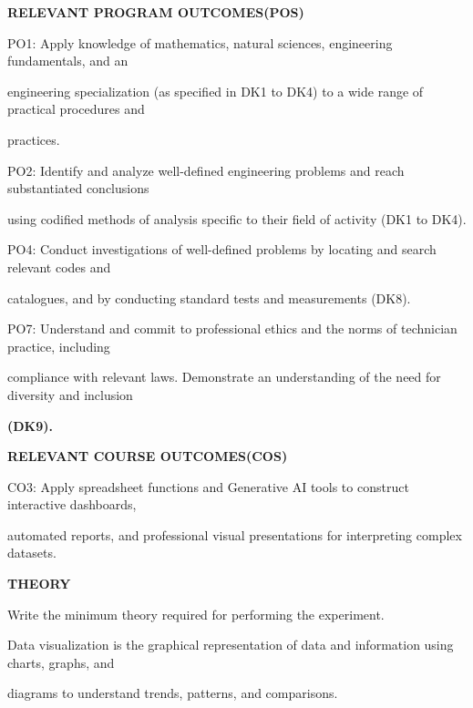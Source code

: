 \documentclass[10pt,a4paper]{article}
\begin{document}
\medskip\noindent\textbf{RELEVANT PROGRAM OUTCOMES(POS)}\par
\noindent PO1: Apply knowledge of mathematics, natural sciences, engineering fundamentals, and an\par
\noindent engineering specialization (as specified in DK1 to DK4) to a wide range of practical procedures and\par
\noindent practices.\par
\noindent PO2: Identify and analyze well-defined engineering problems and reach substantiated conclusions\par
\noindent using codified methods of analysis specific to their field of activity (DK1 to DK4).\par
\noindent PO4: Conduct investigations of well-defined problems by locating and search relevant codes and\par
\noindent catalogues, and by conducting standard tests and measurements (DK8).\par
\noindent PO7: Understand and commit to professional ethics and the norms of technician practice, including\par
\noindent compliance with relevant laws. Demonstrate an understanding of the need for diversity and inclusion\par
\medskip\noindent\textbf{(DK9).}\par

\medskip\noindent\textbf{RELEVANT COURSE OUTCOMES(COS)}\par
\noindent CO3: Apply spreadsheet functions and Generative AI tools to construct interactive dashboards,\par
\noindent automated reports, and professional visual presentations for interpreting complex datasets.\par

\medskip\noindent\textbf{THEORY}\par
\noindent Write the minimum theory required for performing the experiment.\par
\noindent Data visualization is the graphical representation of data and information using charts, graphs, and\par
\noindent diagrams to understand trends, patterns, and comparisons.\par
\end{document}
